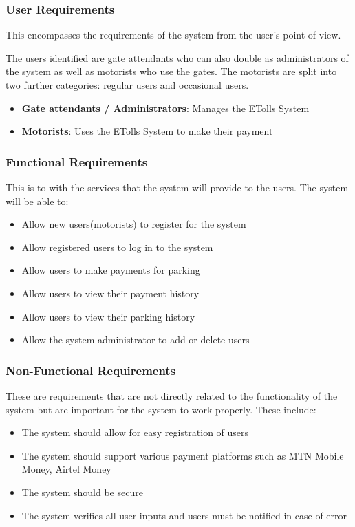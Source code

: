 \subsubsection{User Requirements}
This encompasses the requirements of the system from the user’s point of view.

The users identified are gate attendants who can also double as administrators of the system as well as motorists who use the gates. The motorists are split into two further categories: regular users and occasional users.
\begin{itemize}
    \item \textbf{Gate attendants / Administrators}: Manages the ETolls System
    \item \textbf{Motorists}: Uses the ETolls System to make their payment
\end{itemize}

\subsubsection{Functional Requirements}
This is to with the services that the system will provide to the users. The system will be able to:
\begin{itemize}
    \item Allow new users(motorists) to register for the system
    \item Allow registered users to log in to the system
    \item Allow users to make payments for parking
    \item Allow users to view their payment history
    \item Allow users to view their parking history
    \item Allow the system administrator to add or delete users
\end{itemize}

\subsubsection{Non-Functional Requirements}
These are requirements that are not directly related to the functionality of the system but are important for the system to work properly. These include:
\begin{itemize}
    \item The system should allow for easy registration of users
    \item The system should support various payment platforms such as MTN Mobile Money, Airtel Money
    \item The system should be secure
    \item The system verifies all user inputs and users must be notified in case of error
\end{itemize}


